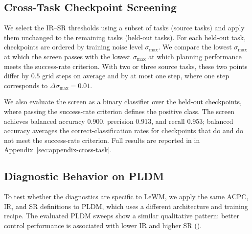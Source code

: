 \documentclass{article}
\begin{document}



\subsection{Cross-Task Checkpoint Screening}
\label{sec:exp-frozen-external}

We select the IR--SR thresholds using a subset of tasks (source tasks) and
apply them unchanged to the remaining tasks (held-out tasks). For each
held-out task, checkpoints are ordered by training noise level
$\sigma_{\max}$. We compare the lowest $\sigma_{\max}$ at which the screen
passes with the lowest $\sigma_{\max}$ at which planning performance meets the
success-rate criterion. With two or three source tasks, these two points differ
by $0.5$ grid steps on average and by at most one step, where one step
corresponds to $\Delta\sigma_{\max}=0.01$.

We also evaluate the screen as a binary classifier over the held-out
checkpoints, where passing the success-rate criterion defines the positive
class. The screen achieves balanced accuracy $0.900$, precision $0.913$, and
recall $0.953$; balanced accuracy averages the correct-classification rates
for checkpoints that do and do not meet the success-rate criterion. Full
results are reported in  in
Appendix~\ref{sec:appendix-cross-task}.



\subsection{Diagnostic Behavior on PLDM}
\label{sec:exp-pldm-diagnostics}

To test whether the diagnostics are specific to LeWM, we apply the same ACPC,
IR, and SR definitions to PLDM, which uses a different architecture and
training recipe. The evaluated PLDM sweeps show a similar qualitative pattern:
better control performance is associated with lower IR and higher SR
().
\end{document}

